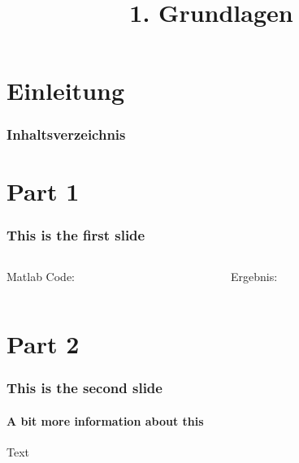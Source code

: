 

\title{\\{\scriptsize 1. Grundlagen}}


    

    \section{Einleitung}
    \begin{frame}
        \frametitle{Inhaltsverzeichnis}
        \tableofcontents[currentsection]
    \end{frame}

    \section{Part 1}
    \begin{frame}
        \frametitle{This is the first slide}
        \begin{columns}[t]
          \begin{column}{5cm}
            \begin{exampleblock}{Matlab Code:}
              
            \end{exampleblock}
          \end{column}
          \begin{column}{5cm}
            \begin{block}{Ergebnis:}
              
            \end{block}
          \end{column}
        \end{columns}

    \end{frame}

    \section{Part 2}
    \begin{frame}
        \frametitle{This is the second slide}
        \framesubtitle{A bit more information about this}
        Text
    \end{frame}

